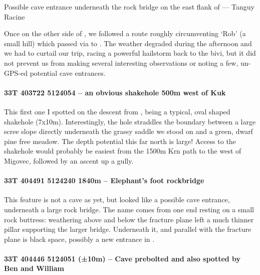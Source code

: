 \begin{marginfigure}
        \centering
        
        \caption{Possible cave entrance underneath the rock bridge on the east flank of \protect{}  --- Tanguy Racine} \label{rockbridge}
    \end{marginfigure}
    

Once on the other side of , we followed a route roughly circumventing `Rob' (a small hill) which passed via  to . The weather degraded during the afternoon and we had to curtail our trip, racing a powerful hailstorm back to the bivi, but it did not prevent us from making several interesting observations or noting a few, un-GPS-ed potential cave entrances.

\paragraph{33T 403722 5124054 – an obvious shakehole 500m west of Kuk}

This first one I spotted on the descent from , being a typical, oval shaped shakehole (7x10m). Interestingly, the hole straddles the boundary between a large scree slope directly underneath the grassy saddle we stood on and a green, dwarf pine free meadow. The depth potential this far north is large!  Access to the shakehole would probably be easiest from the 1500m Krn path to the west of Migovec, followed by an ascent up a gully. 

\paragraph{33T 404491 5124240  1840m – Elephant's foot rockbridge}


This feature is not a cave as yet, but looked like a possible cave entrance, underneath a large rock bridge. The name comes from one end resting on a small rock buttress: weathering above and below the fracture plane left a much thinner pillar supporting the larger bridge. Underneath it, and parallel with the fracture plane is black space, possibly a new entrance in .

\paragraph{33T 404446 5124051 (±10m) – Cave prebolted and also spotted by Ben and William}

